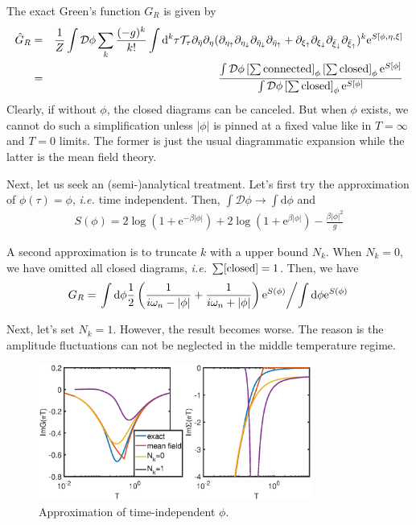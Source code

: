 \documentclass[12pt]{article}
\newcommand{\bea}{\begin{eqnarray}}
\newcommand{\eea}{\end{eqnarray}}
\newcommand{\md}{\mathrm{d}}
\newcommand{\ie}{\textit{i.e.{ }}}
\newcommand{\me}{\mathrm{e}}
\begin{document}
The exact Green's function $G_R$ is given by
\bea \hat{G}_R&=&\frac{1}{Z}\int \mathcal{D}\phi \sum_k \frac{(-g)^k}{k!} \int\md^k\tau\mathcal{T}_\tau \partial_{\bar{\eta}} \partial_\eta (\partial_{\eta_\uparrow}\partial_{\eta_\downarrow}\partial_{\bar{\eta}_\downarrow}\partial_{\bar{\eta}_\uparrow}+\partial_{\xi_\uparrow}\partial_{\xi_\downarrow}\partial_{\bar{\xi}_\downarrow}\partial_{\bar{\xi}_\uparrow})^k \me^{S[\phi,\eta,\xi]} \\
&=&\frac{\int\mathcal{D}\phi \left[\sum {\rm connected}\right]_\phi\left[\sum {\rm closed}\right]_\phi \me^{S[\phi]} }{\int\mathcal{D}\phi \left[\sum {\rm closed}\right]_\phi \me^{S[\phi]}}
\eea
Clearly, if without $\phi$, the closed diagrams can be canceled. But when $\phi$ exists, we cannot do such a simplification unless $|\phi|$ is pinned at a fixed value like in $T=\infty$ and $T=0$ limits. The former is just the usual diagrammatic expansion while the latter is the mean field theory. 

Next, let us seek an (semi-)analytical treatment. Let's first try the approximation of $\phi(\tau)=\phi$, \ie time independent. Then, $\int \mathcal{D}\phi\rightarrow\int\md\phi$ and
\bea S(\phi)=2\log(1+\me^{-\beta|\phi|})+2\log(1+\me^{\beta|\phi|})-\frac{\beta|\phi|^2}{g} \eea  

A second approximation is to truncate $k$ with a upper bound $N_k$. When $N_k=0$, we have omitted all closed diagrams, \ie $\sum[{\rm closed}]=1$. Then, we have
\bea G_R=\left. \int\md \phi \frac{1}{2}\left(\frac{1}{i\omega_n-|\phi|}+\frac{1}{i\omega_n+|\phi|}\right) \me^{S(\phi)}  \middle/ \int\md  \phi \me^{S(\phi)}\right. \eea

Next, let's set $N_k=1$. However, the result becomes worse. The reason is the amplitude fluctuations can not be neglected in the middle temperature regime.  
\begin{figure}[h]
    \begin{center}
    \includegraphics[width=0.8\textwidth]{result.eps}
    \caption{Approximation of time-independent $\phi$.}
    \end{center}
\end{figure}
\end{document}
